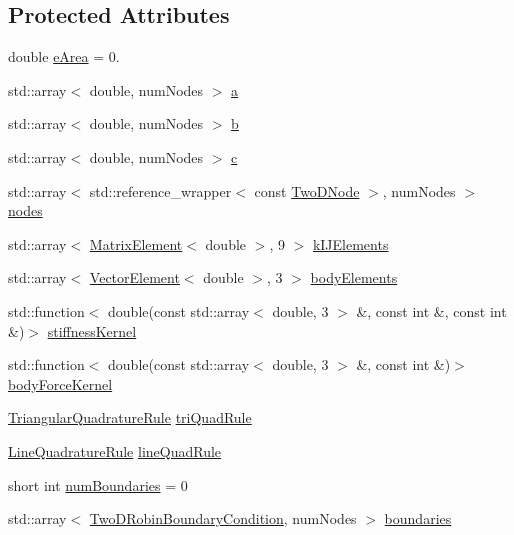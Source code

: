 \subsection*{Protected Attributes}
\begin{DoxyCompactItemize}
\item 
double \hyperlink{a00789_ab74cbf3ff783201003c53439f79307e4}{e\+Area} = 0.
\item 
std\+::array$<$ double, num\+Nodes $>$ \hyperlink{a00789_aad7071cc0cf8762bad7b59789b7bb5fc}{a}
\item 
std\+::array$<$ double, num\+Nodes $>$ \hyperlink{a00789_a75eeb5e4f9b5f6610b0e7112f8324b86}{b}
\item 
std\+::array$<$ double, num\+Nodes $>$ \hyperlink{a00789_ad9152e640f73a7b832ee6d45a1cce567}{c}
\item 
std\+::array$<$ std\+::reference\+\_\+wrapper$<$ const \hyperlink{a00210_a92dafcc05a788e1065a5792b67f0f70e}{Two\+D\+Node} $>$, num\+Nodes $>$ \hyperlink{a00789_add9415a1262a4d58136e1ef11507360b}{nodes}
\item 
std\+::array$<$ \hyperlink{a00210_a1a12603621e7a1efa59ac5cb79f9d509}{Matrix\+Element}$<$ double $>$, 9 $>$ \hyperlink{a00789_a9126763a046ac0736d72b6b5d20ba80d}{k\+I\+J\+Elements}
\item 
std\+::array$<$ \hyperlink{a00210_a08f01d4bb892cf7b2386d0f3a8643d72}{Vector\+Element}$<$ double $>$, 3 $>$ \hyperlink{a00789_a8a85094c0060a67aa1b6abf4a5e660a6}{body\+Elements}
\item 
std\+::function$<$ double(const std\+::array$<$ double, 3 $>$ \&, const int \&, const int \&)$>$ \hyperlink{a00789_ae2480b5335fe78245cb1006e3eeb034d}{stiffness\+Kernel}
\item 
std\+::function$<$ double(const std\+::array$<$ double, 3 $>$ \&, const int \&)$>$ \hyperlink{a00789_a48dbf56bce64a1e97332b03309720154}{body\+Force\+Kernel}
\item 
\hyperlink{a00889}{Triangular\+Quadrature\+Rule} \hyperlink{a00789_a5e50303ae2cfb783f44de143be8a9aac}{tri\+Quad\+Rule}
\item 
\hyperlink{a00885}{Line\+Quadrature\+Rule} \hyperlink{a00789_ad20a70ab85fd002e3bfe41b5a8912405}{line\+Quad\+Rule}
\item 
short int \hyperlink{a00789_a70ceb410983c87c36546a2a95306dac6}{num\+Boundaries} = 0
\item 
std\+::array$<$ \hyperlink{a00805}{Two\+D\+Robin\+Boundary\+Condition}, num\+Nodes $>$ \hyperlink{a00789_a3b9ec5bc80554d9ffcdd26248061c79f}{boundaries}
\item 

\end{DoxyCompactItemize}
